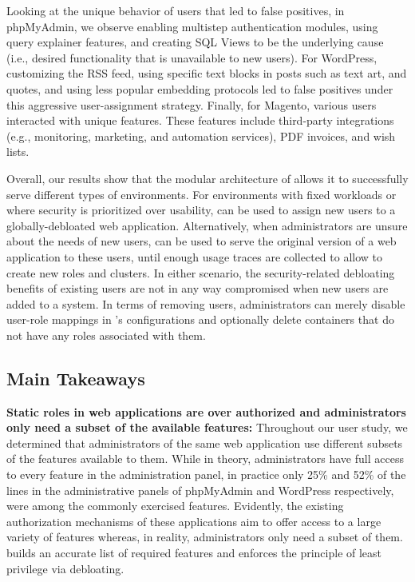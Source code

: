 Looking at the unique behavior of users that led to false positives, in phpMyAdmin, we observe enabling multistep authentication modules, using query explainer features, and creating SQL Views to be the underlying cause (i.e., desired functionality that is unavailable to new users). For WordPress, customizing the RSS feed, using specific text blocks in posts such as text art, and quotes, and using less popular embedding protocols led to false positives under this aggressive user-assignment strategy. Finally, for Magento, various users interacted with unique features.  These features include third-party integrations (e.g., monitoring, marketing, and automation services), PDF invoices, and wish lists. 

Overall, our results show that the modular architecture of \dbltr{} allows it to successfully serve different types of environments. For environments with fixed workloads or where security is prioritized over usability, \dbltr{} can be used to assign new users to a globally-debloated web application. Alternatively, when administrators are unsure about the needs of new users, \dbltr{} can be used to serve the original version of a web application to these users, until enough usage traces are collected to allow \dbltr{} to create new roles and clusters. In either scenario, the security-related debloating benefits of existing users are not in any way compromised when new users are added to a system. In terms of removing users, administrators can merely disable user-role mappings in \dbltr{}'s configurations and optionally delete containers that do not have any roles associated with them.

\subsection{Main Takeaways}

\noindent\textbf{Static roles in web applications are over authorized and administrators only need a subset of the available features:} 
Throughout our user study, we determined that administrators of the same web application use different subsets of the features available to them. 
While in theory, administrators have full access to every feature in the administration panel, in practice only 25\% and 52\% of the lines in the administrative panels of phpMyAdmin and WordPress respectively, were among the commonly exercised features. 
Evidently, the existing authorization mechanisms of these applications aim to offer access to a large variety of features whereas, in reality, administrators only need a subset of them. 
\dbltr{} builds an accurate list of required features and enforces the principle of least privilege via debloating. 

